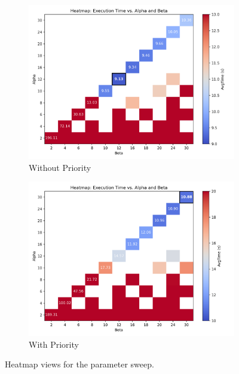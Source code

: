 
\begin{figure}
    \centering
        \begin{subfigure}{0.5\linewidth}
        \centering
        \includegraphics[width=\linewidth]{heatmap_without_priority.png}
        \caption{Without Priority}
        \label{fig:exp1_heatmap_a}
    \end{subfigure}\hfill
    \begin{subfigure}{0.5\linewidth}
        \centering
        \includegraphics[width=\linewidth]{heatmap_with_priority.png}
        \caption{With Priority}
        \label{fig:exp1_heatmap_b}
    \end{subfigure}
    \caption{Heatmap views for the parameter sweep.}
    \label{fig:exp1_heatmap}
\end{figure}

